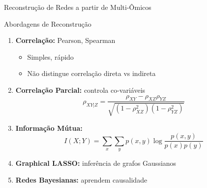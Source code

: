\begin{frame}{Reconstrução de Redes a partir de Multi-Ômicos}
\begin{block}{Abordagens de Reconstrução}
\begin{enumerate}
    \item \textbf{Correlação:} Pearson, Spearman
    \begin{itemize}
        \item Simples, rápido
        \item Não distingue correlação direta vs indireta
    \end{itemize}

    \item \textbf{Correlação Parcial:} controla co-variáveis
    \begin{equation*}
    \rho_{XY|Z} = \frac{\rho_{XY} - \rho_{XZ}\rho_{YZ}}{\sqrt{(1-\rho_{XZ}^2)(1-\rho_{YZ}^2)}}
    \end{equation*}

    \item \textbf{Informação Mútua:}
    \begin{equation*}
    I(X;Y) = \sum_x\sum_y p(x,y)\log\frac{p(x,y)}{p(x)p(y)}
    \end{equation*}

    \item \textbf{Graphical LASSO:} inferência de grafos Gaussianos
    \item \textbf{Redes Bayesianas:} aprendem causalidade
\end{enumerate}
\end{block}
\end{frame}

